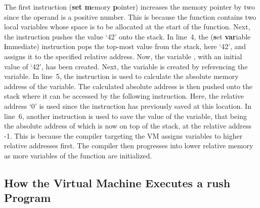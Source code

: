 
The first instruction  (\textbf{set m}emory \textbf{p}ointer) increases the memory pointer by two since the operand is a positive number.
This is because the  function contains two local variables whose space is to be allocated at the start of the function.
Next, the  instruction pushes the value `42' onto the stack.
In line~4, the  (\textbf{s}et \textbf{var}iable \textbf{i}mmediate) instruction pops the top-most value from the stack, here `42', and assigns it to the specified relative address.
Now, the variable , with an initial value of `42', has been created.
Next, the  variable is created by referencing the  variable.
In line~5, the  instruction is used to calculate the absolute memory address of the  variable.
The calculated absolute address is then pushed onto the stack where it can be accessed by the following instruction.
Here, the relative address `0' is used since the  instruction has previously saved  at this location.
In line~6, another  instruction is used to save the value of the  variable,
that being the absolute address of  which is now on top of the stack, at the relative address -1.
This is because the compiler targeting the VM assigns variables to higher relative addresses first.
The compiler then progresses into lower relative memory as more variables of the function are initialized.

\subsection{How the Virtual Machine Executes a rush Program}


